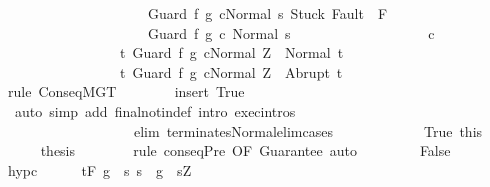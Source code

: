 \begin{isabellebody}
\ \ \ \ \ \ \ \ \ \ \ \ \ \ \ \ \ \ \ \ \ {\isasymGamma}{\isasymturnstile}{\isasymlangle}Guard\ f\ g\ c{\isacharcomma}Normal\ s{\isasymrangle}\ {\isasymRightarrow}{\isasymnotin}{\isacharparenleft}{\isacharbraceleft}Stuck{\isacharbraceright}{\isasymunion}\ Fault\ {\isacharbackquote}\ {\isacharparenleft}{\isacharminus}F{\isacharparenright}{\isacharparenright}{\isasymand}\isanewline
\ \ \ \ \ \ \ \ \ \ \ \ \ \ \ \ \ \ \ \ \ {\isasymGamma}{\isasymturnstile}Guard\ f\ g\ c{\isasymdown}\ Normal\ s{\isacharbraceright}{\isacharparenright}\isanewline
\ \ \ \ \ \ \ \ \ \ \ \ \ \ \ \ \ \ \ c\isanewline
\ \ \ \ \ \ \ \ \ \ \ \ \ \ \ \ \ {\isacharbraceleft}t{\isachardot}\ {\isasymGamma}{\isasymturnstile}{\isasymlangle}Guard\ f\ g\ c{\isacharcomma}Normal\ Z{\isasymrangle}\ {\isasymRightarrow}\ Normal\ t{\isacharbraceright}{\isacharcomma}\isanewline
\ \ \ \ \ \ \ \ \ \ \ \ \ \ \ \ \ {\isacharbraceleft}t{\isachardot}\ {\isasymGamma}{\isasymturnstile}{\isasymlangle}Guard\ f\ g\ c{\isacharcomma}Normal\ Z{\isasymrangle}\ {\isasymRightarrow}\ Abrupt\ t{\isacharbraceright}{\isachardoublequoteclose}\isanewline
\ \ \ \ \ \ \isamarkupfalse%
\ {\isacharparenleft}rule\ ConseqMGT{\isacharparenright}\isanewline
\ \ \ \ \ \ \isamarkupfalse%
\ {\isacharparenleft}insert\ True{\isacharparenright}\isanewline
\ \ \ \ \ \ \isamarkupfalse%
\ \ {\isacharparenleft}auto\ simp\ add{\isacharcolon}\ final{\isacharunderscore}notin{\isacharunderscore}def\ intro{\isacharcolon}\ exec{\isachardot}intros\ \isanewline
\ \ \ \ \ \ \ \ \ \ \ \ \ \ \ \ \ \ \ elim{\isacharcolon}\ terminates{\isacharunderscore}Normal{\isacharunderscore}elim{\isacharunderscore}cases{\isacharparenright}\isanewline
\ \ \ \ \ \ \isamarkupfalse%
\isanewline
\ \ \ \ \isamarkupfalse%
\ True\ this\isanewline
\ \ \ \ \isamarkupfalse%
\ {\isacharquery}thesis\isanewline
\ \ \ \ \ \ \isamarkupfalse%
\ {\isacharparenleft}rule\ conseqPre\ {\isacharbrackleft}OF\ Guarantee{\isacharbrackright}{\isacharparenright}\ auto\isanewline
\ \ \isamarkupfalse%
\isanewline
\ \ \ \ \isamarkupfalse%
\ False\isanewline
\ \ \ \ \isamarkupfalse%
\ hyp{\isacharunderscore}c\isanewline
\ \ \ \ \isamarkupfalse%
\ {\isachardoublequoteopen}{\isasymGamma}{\isacharcomma}{\isasymTheta}{\isasymturnstile}\isactrlsub t\isactrlbsub {\isacharslash}F\ \isactrlesub {\isacharparenleft}g\ {\isasyminter}\ {\isacharbraceleft}s{\isachardot}\ s\ {\isasymin}\ g\ {\isasymand}\ s{\isacharequal}Z\ {\isasymand}\ \isanewline

\end{isabellebody}
